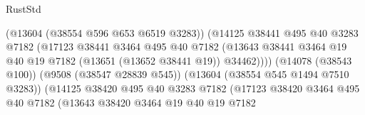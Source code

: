 \begin{lexlean}{RustStd}
\begin{coremodule}
                                                (@13604 (@38554 @596 @653 @6519 @3283))
                                                (@14125
                                                  @38441
                                                  @495
                                                  @40
                                                  @3283
                                                  @7182
                                                  (@17123
                                                    @38441
                                                    @3464
                                                    @495
                                                    @40
                                                    @7182
                                                    (@13643
                                                      @38441
                                                      @3464
                                                      @19
                                                      @40
                                                      @19
                                                      @7182
                                                      (@13651 (@13652 @38441 @19))
                                                      @34462))))
                                              (@14078 (@38543 @100))
                                              (@9508 (@38547 @28839 @545))
                                              (@13604 (@38554 @545 @1494 @7510 @3283))
                                              (@14125
                                                @38420
                                                @495
                                                @40
                                                @3283
                                                @7182
                                                (@17123
                                                  @38420
                                                  @3464
                                                  @495
                                                  @40
                                                  @7182
                                                  (@13643
                                                    @38420
                                                    @3464
                                                    @19
                                                    @40
                                                    @19
                                                    @7182

\end{coremodule}
\end{lexlean}
